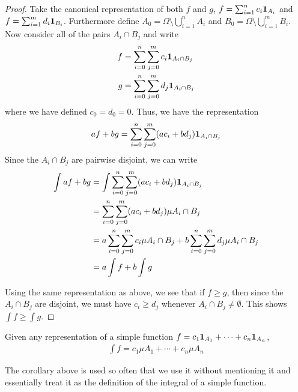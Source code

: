 \begin{proof}Take the canonical representation of both $f$ and $g$, $f
  = \sum_{i=1}^n c_i \textbf{1}_{A_i}$ and $f
  = \sum_{i=1}^m d_i \textbf{1}_{B_i}$.   Furthermore define $A_0 =
  \Omega \setminus \bigcup_{i=1}^n A_i$ and $B_0 =
  \Omega \setminus \bigcup_{i=1}^m B_i$.  Now consider all of the
  pairs $A_i \cap B_j$ and write 
\begin{align*}
f &= \sum_{i=0}^n \sum_{j=0}^m c_i
  \textbf{1}_{A_i \cap B_j} \\
g &= \sum_{i=0}^n \sum_{j=0}^m d_j
  \textbf{1}_{A_i \cap B_j}
\end{align*}
 where we have defined $c_0=d_0=0$.  Thus, we have the  representation 
\begin{align*}
af + bg = \sum_{i=0}^n \sum_{j=0}^m (ac_i + bd_j)   \textbf{1}_{A_i \cap
  B_j}
\end{align*}
Since the $A_i  \cap B_j$ are pairwise disjoint, we can write
\begin{align*}
\int af+bg &= \int \sum_{i=0}^n \sum_{j=0}^m (ac_i + bd_j)   \textbf{1}_{A_i \cap B_j} \\
&= \sum_{i=0}^n \sum_{j=0}^m (ac_i + bd_j)   \mu A_i \cap B_j \\
&= a \sum_{i=0}^n \sum_{j=0}^m c_i  \mu A_i \cap B_j + b \sum_{i=0}^n
\sum_{j=0}^m d_j  \mu A_i \cap B_j \\
&= a \int f + b \int g
\end{align*}

Using the same representation as above, we see that if $f \geq g$,
then since the $A_i \cap B_j$ are disjoint, we must have $c_i \geq
d_j$ whenever $A_i \cap B_j \neq \emptyset$.  This shows $\int f \geq
\int g$.
\end{proof}
\begin{cor}Given any representation of a simple function $f =
c_1 \textbf{1}_{A_1} + \cdots + c_n \textbf{1}_{A_n}$,
\begin{align*}
\int f  = c_1 \mu A_1 + \cdots + c_n \mu A_n
\end{align*} 
\end{cor}
The corollary above is used so often that we use it without mentioning
it and essentially treat it as the definition of the integral of a
simple function.

